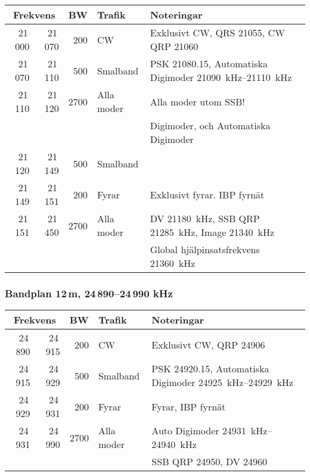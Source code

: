 \begin{tabular}{rrrll}
\multicolumn{2}{c}{\textbf{Frekvens}} & \textbf{BW} & \textbf{Trafik} & \textbf{Noteringar} \\ \hline

21\,000 & 21\,070 & 200  & CW         & Exklusivt CW, QRS \num{21055}, CW QRP \num{21060}                                          \\ \hline
21\,070 & 21\,110 & 500  & Smalband   & PSK \num{21080,15}, Automatiska Digimoder \SIrange{21090}{21110}{\kilo\hertz}              \\
21\,110 & 21\,120 & 2700 & Alla moder & Alla moder utom SSB!                                                                       \\
        &         &      &            & Digimoder, och Automatiska Digimoder                                                       \\ \hline
21\,120 & 21\,149 & 500  & Smalband   &                                                                                            \\ \hline
21\,149 & 21\,151 & 200  & Fyrar      & Exklusivt fyrar. IBP fyrnät                                                                \\ \hline
21\,151 & 21\,450 & 2700 & Alla moder & DV \SI{21180}{\kilo\hertz}, SSB QRP \SI{21285}{\kilo\hertz}, Image \SI{21340}{\kilo\hertz} \\
        &         &      &            & Global hjälpinsatsfrekvens \SI{21360}{\kilo\hertz}                                         \\ \hline
\end{tabular}

\subsubsection{Bandplan 12\,m, 24\,890--24\,990 kHz}
\begin{tabular}{rrrll}
\multicolumn{2}{c}{\textbf{Frekvens}} & \textbf{BW} & \textbf{Trafik} & \textbf{Noteringar} \\ \hline

24\,890 & 24\,915 & 200  & CW         & Exklusivt CW, QRP \num{24906}                      \\ \hline
24\,915 & 24\,929 & 500  & Smalband   & PSK \num{24920,15}, Automatiska
                                        Digimoder \SIrange{24925}{24929}{\kilo\hertz}      \\ \hline
24\,929 & 24\,931 & 200  & Fyrar      & Fyrar, IBP fyrnät                                  \\ \hline
24\,931 & 24\,990 & 2700 & Alla moder & Auto Digimoder \SIrange{24931}{24940}{\kilo\hertz} \\
        &         &      &            & SSB QRP \num{24950}, DV \num{24960}{}              \\ \hline
\end{tabular}

